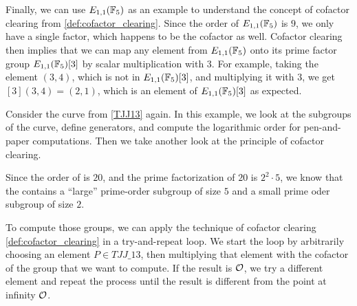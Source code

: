 \begin{example}
Finally, we can use $E_{1,1}(\mathbb{F}_5)$ as an example to understand the concept of cofactor clearing from  {\ref{def:cofactor_clearing}}. Since the order of $E_{1,1}(\mathbb{F}_5)$ is $9$, we only have a single factor, which happens to be the cofactor as well. Cofactor clearing then implies that we can map any element from $E_{1,1}(\mathbb{F}_5)$ onto its prime factor group $E_{1,1}(\mathbb{F}_5)[3]$ by scalar multiplication with $3$. For example, taking the element $(3,4)$, which is not in $E_{1,1}(\mathbb{F}_5)[3]$, and multiplying it with $3$, we get $[3](3,4)= (2,1)$, which is an element of $E_{1,1}(\mathbb{F}_5)[3]$ as expected.
\end{example}



\begin{example}\label{ex:TJJ13-cofactor-clearing} Consider the  curve \TJJ{} from \examplename{} \ref{TJJ13} again. In this example, we look at the subgroups of the  curve, define generators, and compute the logarithmic order for pen-and-paper computations. Then we take another look at the principle of cofactor clearing.

Since the order of \TJJ{} is $20$, and the prime factorization of $20$ is $2^2\cdot 5$, we know that the \TJJ{} contains a ``large'' prime-order subgroup of size $5$ and a small prime oder subgroup of size $2$. 

To compute those groups, we can apply the technique of cofactor clearing \eqref{def:cofactor_clearing} in a try-and-repeat loop. We start the loop by arbitrarily choosing an element $P\in \mathit{TJJ\_13}$, then multiplying that element with the cofactor of the group that we want to compute. If the result is $\mathcal{O}$, we try a different element and repeat the process until the result is different from the point at infinity $\mathcal{O}$.  


\end{example}

